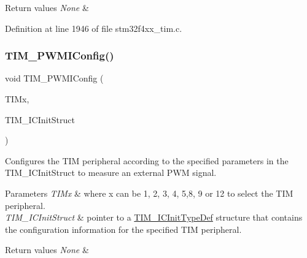 \begin{DoxyRetVals}{Return values}
{\em None} & \\
\hline
\end{DoxyRetVals}


Definition at line 1946 of file stm32f4xx\+\_\+tim.\+c.

\mbox{\label{group___t_i_m___group3_gaa71f9296556310f85628d6c748a06475}} 
\subsubsection{\texorpdfstring{T\+I\+M\+\_\+\+P\+W\+M\+I\+Config()}{TIM\_PWMIConfig()}}
{\footnotesize\ttfamily void T\+I\+M\+\_\+\+P\+W\+M\+I\+Config (\begin{DoxyParamCaption}\item[{\hyperlink{struct_t_i_m___type_def}{T\+I\+M\+\_\+\+Type\+Def} $\ast$}]{T\+I\+Mx,  }\item[{\hyperlink{struct_t_i_m___i_c_init_type_def}{T\+I\+M\+\_\+\+I\+C\+Init\+Type\+Def} $\ast$}]{T\+I\+M\+\_\+\+I\+C\+Init\+Struct }\end{DoxyParamCaption})}



Configures the T\+IM peripheral according to the specified parameters in the T\+I\+M\+\_\+\+I\+C\+Init\+Struct to measure an external P\+WM signal. 


\begin{DoxyParams}{Parameters}
{\em T\+I\+Mx} & where x can be 1, 2, 3, 4, 5,8, 9 or 12 to select the T\+IM peripheral. \\
\hline
{\em T\+I\+M\+\_\+\+I\+C\+Init\+Struct} & pointer to a \hyperlink{struct_t_i_m___i_c_init_type_def}{T\+I\+M\+\_\+\+I\+C\+Init\+Type\+Def} structure that contains the configuration information for the specified T\+IM peripheral. \\
\hline
\end{DoxyParams}

\begin{DoxyRetVals}{Return values}
{\em None} & \\
\hline
\end{DoxyRetVals}


